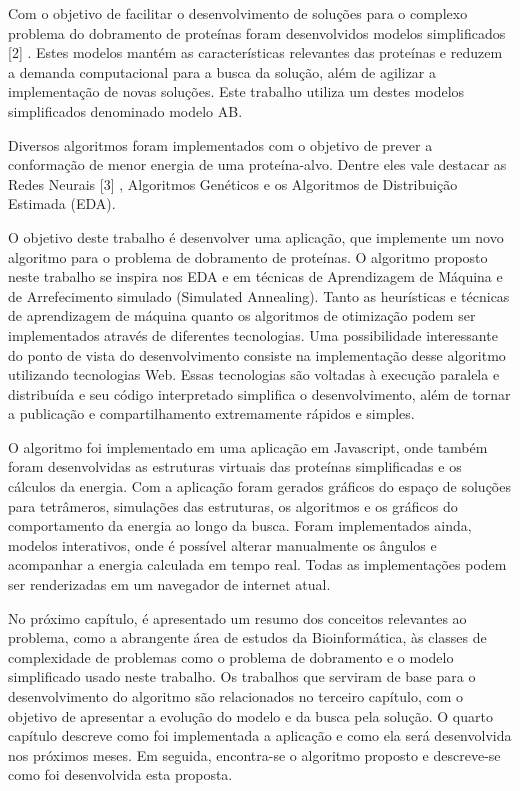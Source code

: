 \documentclass[dm,ppgcomp]{texfurg}
\begin{document}
Com o objetivo de facilitar o desenvolvimento de soluções para o complexo problema do dobramento de proteínas foram desenvolvidos modelos simplificados [2] . Estes modelos mantém as características relevantes das proteínas e reduzem a demanda computacional para a busca da solução, além de agilizar a implementação de novas soluções. Este trabalho utiliza um destes modelos simplificados denominado modelo AB.

Diversos algoritmos foram implementados com o objetivo de prever a conformação de menor energia de uma proteína-alvo. Dentre eles vale destacar as Redes Neurais [3] , Algoritmos Genéticos e os Algoritmos de Distribuição Estimada (EDA).

O objetivo deste trabalho é desenvolver uma aplicação, que implemente um novo algoritmo para o problema de dobramento de proteínas. O algoritmo proposto neste trabalho se inspira nos EDA  e em técnicas de Aprendizagem de Máquina e de Arrefecimento simulado (Simulated Annealing).
Tanto as heurísticas e técnicas de aprendizagem de máquina quanto os algoritmos de otimização podem ser implementados através de diferentes tecnologias. Uma  possibilidade interessante do ponto de vista do desenvolvimento consiste na implementação desse algoritmo utilizando tecnologias Web. Essas tecnologias são voltadas à execução paralela e distribuída e seu código interpretado simplifica o desenvolvimento, além de tornar a publicação e compartilhamento extremamente rápidos e simples.

O algoritmo foi implementado em uma aplicação em Javascript, onde também foram desenvolvidas as estruturas virtuais das proteínas simplificadas e os cálculos da energia. Com a aplicação foram gerados gráficos do espaço de soluções para tetrâmeros, simulações das estruturas, os algoritmos e os gráficos do comportamento da energia ao longo da busca.
Foram implementados ainda, modelos interativos, onde é possível alterar manualmente os ângulos e acompanhar a energia calculada em tempo real. Todas as implementações podem ser renderizadas em um navegador de internet atual.

No próximo capítulo, é apresentado um resumo dos conceitos relevantes ao problema, como a abrangente área de estudos da Bioinformática, às classes de complexidade de problemas como o problema de dobramento e o modelo simplificado usado neste trabalho.
Os trabalhos que serviram de base para o desenvolvimento do algoritmo são relacionados no terceiro capítulo, com o objetivo de apresentar a evolução do modelo e da busca pela solução.
O quarto capítulo descreve como foi implementada a aplicação e como ela será desenvolvida nos próximos meses. Em seguida, encontra-se o algoritmo proposto e descreve-se como foi desenvolvida esta proposta.  
\end{document}
